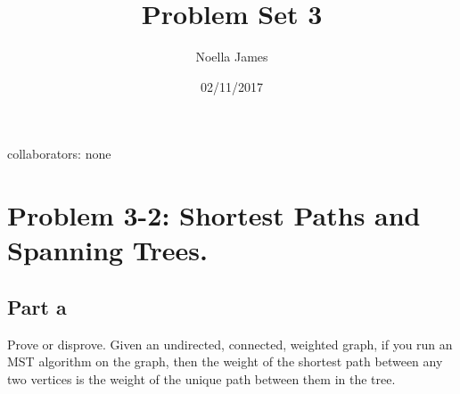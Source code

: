 \documentclass{article}
\theoremstyle{definition}
\theoremstyle{remark}
\theoremstyle{plain}
\begin{document}
\title{Problem Set 3}
\date{02/11/2017}
\author{Noella James}
\maketitle
collaborators: none\\

\section{Problem 3-2: Shortest Paths and Spanning Trees.}

\subsection{Part a}
Prove or disprove. Given an undirected, connected, weighted graph, if you run an MST algorithm on the graph, then the weight of the shortest path between any two vertices is the weight of the unique path between them in the tree.\\
\end{document}
